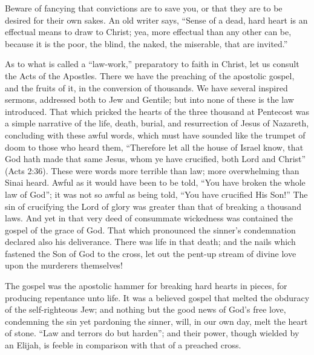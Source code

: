 \documentclass[
]{book}
\begin{document}
Beware of fancying that convictions are to save you, or that they are to be desired for their own sakes. An old writer says, ``Sense of a dead, hard heart is an effectual means to draw to Christ; yea, more effectual than any other can be, because it is the poor, the blind, the naked, the miserable, that are invited.''

As to what is called a ``law-work,'' preparatory to faith in Christ, let us consult the Acts of the Apostles. There we have the preaching of the apostolic gospel, and the fruits of it, in the conversion of thousands. We have several inspired sermons, addressed both to Jew and Gentile; but into none of these is the law introduced. That which pricked the hearts of the three thousand at Pentecost was a simple narrative of the life, death, burial, and resurrection of Jesus of Nazareth, concluding with these awful words, which must have sounded like the trumpet of doom to those who heard them, ``Therefore let all the house of Israel know, that God hath made that same Jesus, whom ye have crucified, both Lord and Christ'' (Acts 2:36). These were words more terrible than law; more overwhelming than Sinai heard. Awful as it would have been to be told, ``You have broken the whole law of God''; it was not so awful as being told, ``You have crucified His Son!'' The sin of crucifying the Lord of glory was greater than that of breaking a thousand laws. And yet in that very deed of consummate wickedness was contained the gospel of the grace of God. That which pronounced the sinner's condemnation declared also his deliverance. There was life in that death; and the nails which fastened the Son of God to the cross, let out the pent-up stream of divine love upon the murderers themselves!

The gospel was the apostolic hammer for breaking hard hearts in pieces, for producing repentance unto life. It was a believed gospel that melted the obduracy of the self-righteous Jew; and nothing but the good news of God's free love, condemning the sin yet pardoning the sinner, will, in our own day, melt the heart of stone. ``Law and terrors do but harden''; and their power, though wielded by an Elijah, is feeble in comparison with that of a preached cross.
\end{document}
